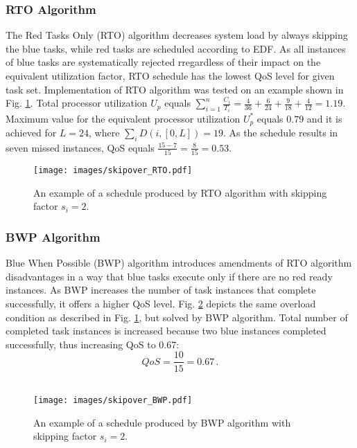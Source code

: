 \subsubsection{RTO Algorithm}
The Red Tasks Only (RTO) algorithm decreases system load by always skipping the blue tasks, while red tasks are scheduled according to EDF. 
As all instances of blue tasks are systematically rejected rregardless of their impact on the equivalent utilization factor, RTO schedule has the lowest QoS level for given task set.
Implementation of RTO algorithm was tested on an example shown in 
Fig. \ref{rto}.
Total processor utilization $U_p$ equals
$\sum_{i=1}^{n}\frac{C_i}{T_i} = \frac{4}{36} + \frac{6}{24} + \frac{9}{18} + \frac{4}{12} = 1.19.$
Maximum value for the equivalent processor utilization $U_p^\ast$ equals $0.79$ and it is achieved for $L = 24$, where $\sum_{i}D(i, [0, L]) = 19$.
As the schedule results in seven missed instances, QoS equals
$\frac{15 - 7}{15} = \frac{8}{15} = 0.53.$

\begin{figure}[ht]
    \centering
    \texttt{[image: images/skipover\_RTO.pdf]}
    \caption{An example of a schedule produced by RTO algorithm with skipping factor $s_i=2$.}
    \label{rto}
\end{figure}

\subsubsection{BWP Algorithm}
Blue When Possible (BWP) algorithm introduces amendments of RTO algorithm disadvantages in a way that blue tasks execute only if there are no red ready instances.
As BWP increases the number of task instances that complete successfully, it offers a higher QoS level. 
Fig. \ref{bwp} depicts the same overload condition as described in Fig. 
\ref{rto}, but solved by BWP algorithm. 
Total number of completed task instances is increased because two blue instances completed successfully, thus increasing QoS to 0.67:
\begin{equation*}
QoS = \frac{10}{15} = 0.67 \, .
\end{equation*}
\\
\begin{figure}[ht]
    \centering
    \texttt{[image: images/skipover\_BWP.pdf]}
    \caption{An example of a schedule produced by BWP algorithm with skipping factor $s_i=2$.}
    \label{bwp}
\end{figure}

